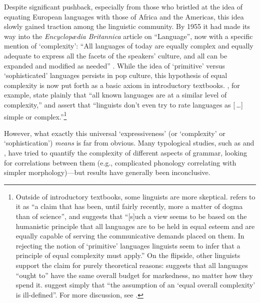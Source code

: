 \documentclass[12pt,twoside]{article}
\begin{document}
Despite significant pushback, especially from those who bristled at the idea of equating European languages with those of Africa and the Americas, this idea slowly gained traction among the linguistic community. By 1955 it had made its way into the \emph{Encyclopædia Britannica} article on ``Language'', now with a specific mention of `complexity': ``All languages of today are equally complex and equally adequate to express all the facets of the speakers' culture, and all can be expanded and modified as needed'' \citep[698]{trager}. While the idea of `primitive' versus `sophisticated' languages persists in pop culture, this hypothesis of equal complexity is now put forth as a basic axiom in introductory textbooks. \citet[8]{akmajian}, for example, state plainly that ``all known languages are at a similar level of complexity,'' and \citet[8]{ogrady} assert that ``linguists don't even try to rate languages as [\,\ldots] simple or complex.''\footnote{Outside of introductory textbooks, some linguists are more skeptical. \citet[2]{shosted} refers to it as ``a claim that has been, until fairly recently, more a matter of dogma than of science'', and \citet[216]{maddieson} suggests that ``[s]uch a view seems to be based on the humanistic principle that all languages are to be held in equal esteem and are equally capable of serving the communicative demands placed on them. In rejecting the notion of `primitive' languages linguists seem to infer that a principle of equal complexity must apply.'' On the flipside, other linguists support the claim for purely theoretical reasons: \citet[165-166]{chomsky} suggests that all languages ``ought to'' have the same overall budget for markedness, no matter how they spend it. \citet[540]{pellegrino} suggest simply that ``the assumption of an `equal overall complexity' is ill-defined''. For more discussion, see \cite{joseph}.}


However, what exactly this universal `expressiveness' (or `complexity' or `sophistication') \emph{means} is far from obvious. Many typological studies, such as \citet{maddieson} and \citet{shosted}, have tried to quantify the complexity of different aspects of grammar, looking for correlations between them (e.g., complicated phonology correlating with simpler morphology)---but results have generally been inconclusive.
\end{document}
